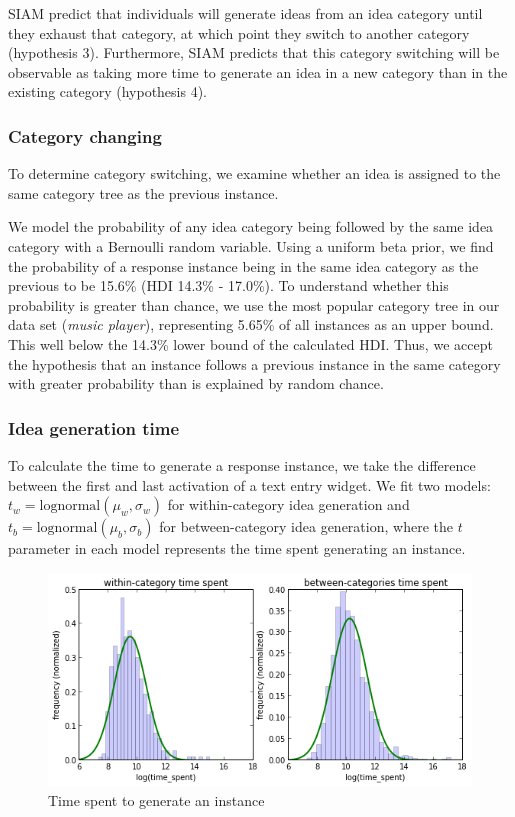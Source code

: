 SIAM predict that individuals will generate ideas from an idea category until they exhaust that category, at which point they switch to another category (hypothesis 3). Furthermore, SIAM predicts that this category switching will be observable as taking more time to generate an idea in a new category than in the existing category (hypothesis 4). %

\subsubsection{Category changing}

To determine category switching, we examine whether an idea is assigned to the same category tree as the previous instance.%

We model the probability of any idea category being followed by the same idea category with a Bernoulli random variable. Using a uniform beta prior, we find the probability of a response instance being in the same idea category as the previous to be 15.6\% (HDI 14.3\% - 17.0\%). To understand whether this probability is greater than chance, we use the most popular category tree in our data set (\emph{music player}), representing 5.65\% of all instances as an upper bound. This well below the 14.3\% lower bound of the calculated HDI. Thus, we accept the hypothesis that an instance follows a previous instance in the same category with greater probability than is explained by random chance.

\subsubsection{Idea generation time}

To calculate the time to generate a response instance, we take the difference between the first and last activation of a text entry widget.
We fit two models: $t_w = \text{lognormal}(\mu_w, \sigma_w)$ for within-category idea generation and $t_b = \text{lognormal}(\mu_b, \sigma_b)$ for between-category idea generation, where the $t$ parameter in each model represents the time spent generating an instance.

\begin{figure}[h]
    \centering
    \includegraphics[width=0.9\columnwidth]{hyp5_comparison}
    \caption{Time spent to generate an instance}
    \label{fig:hyp5_comparison}
\end{figure}

